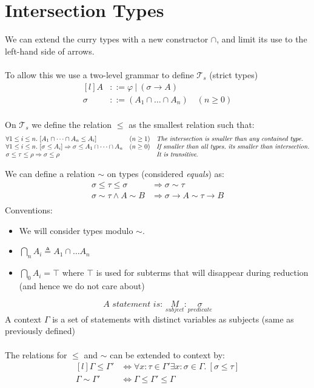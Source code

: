 \chapter{Intersection Types}
We can extend the curry types with a new constructor $\cap$, and limit its use to the left-hand side of arrows.
\\
\\ To allow this we use a two-level grammar to define $\mathcal{T}_s$ (strict types)
\[\begin{matrix*}[l]
    A & ::= \varphi \ | \ (\sigma \to A) \\
    \sigma & ::= (A_1 \cap \dots \cap A_n) \quad (n \geq 0) \\
\end{matrix*}\]

On $\mathcal{T}_s$ we define the relation $\leq$ as the smallest relation such that:
\[\begin{matrix*}[l]
    \forall 1 \leq i \leq n . \ [A_1 \cap \dots \cap A_n \leq A_i] & (n \geq 1)  & \text{\textit{The intersection is smaller than any contained type.}}\\
    \forall 1 \leq i \leq n . \ [\sigma \leq A_i] \Rightarrow \sigma \leq A_1 \cap \dots \cap A_n & (n \geq 0) & \text{\textit{If smaller than all types, its smaller than intersection.}}\\
    \sigma \leq \tau \leq \rho \Rightarrow \sigma \leq \rho & & \text{\textit{It is transitive.}}\\
\end{matrix*}\]

We can define a relation $\sim$ on types (considered \textit{equals}) as:
\[\begin{split}
    \sigma \leq \tau \leq \sigma &\Rightarrow \sigma \sim \tau \\
    \sigma \sim \tau \land A \sim B & \Rightarrow \sigma \to A \sim \tau \to B \\
\end{split}\]
Conventions:
\begin{itemize}
    \item We will consider types modulo $\sim$.
    \item $\bigcap_nA_i \triangleq A_1 \cap \dots A_n$
    \item $\bigcap_0A_i = \top$ where $\top$ is used for subterms that will disappear during reduction (and hence we do not care about)
\end{itemize}

\[\textit{A statement is: } \underset{\textit{subject}}{M} : \underset{\textit{predicate}}{\sigma}\]
A context $\Gamma$ is a set of statements with distinct variables as subjects (same as previously defined)
\\
\\ The relations for $\leq$ and $\sim$ can be extended to context by:
\[\begin{matrix*}[l]
    \Gamma \leq \Gamma' & \Leftrightarrow \forall x : \tau \in \Gamma' \exists x : \sigma \in \Gamma . \ [\sigma \leq \tau] \\
    \Gamma \sim \Gamma' & \Leftrightarrow \Gamma \leq \Gamma' \leq \Gamma \\
\end{matrix*}\]

